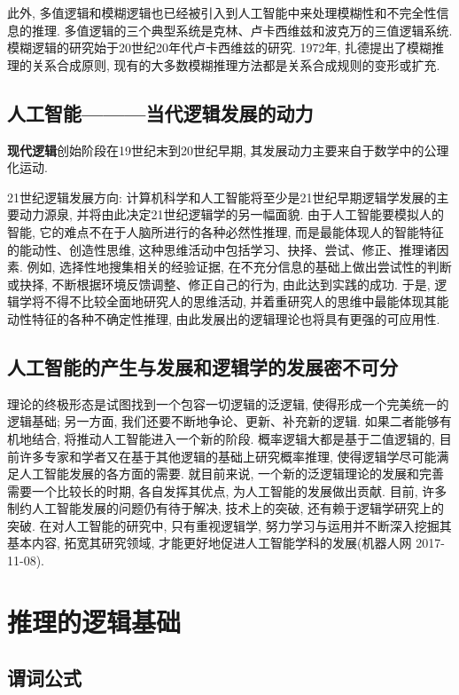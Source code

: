 此外, 多值逻辑和模糊逻辑也已经被引入到人工智能中来处理模糊性和不完全性信息的推理. 多值逻辑的三个典型系统是克林、卢卡西维兹和波克万的三值逻辑系统. 模糊逻辑的研究始于20世纪20年代卢卡西维兹的研究. 1972年, 扎德提出了模糊推理的关系合成原则, 现有的大多数模糊推理方法都是关系合成规则的变形或扩充.
\subsection{人工智能———当代逻辑发展的动力}

\textbf{现代逻辑}创始阶段在19世纪末到20世纪早期, 其发展动力主要来自于数学中的公理化运动.

21世纪逻辑发展方向: 计算机科学和人工智能将至少是21世纪早期逻辑学发展的主要动力源泉, 并将由此决定21世纪逻辑学的另一幅面貌. 由于人工智能要模拟人的智能, 它的难点不在于人脑所进行的各种必然性推理, 而是最能体现人的智能特征的能动性、创造性思维, 这种思维活动中包括学习、抉择、尝试、修正、推理诸因素. 例如, 选择性地搜集相关的经验证据, 在不充分信息的基础上做出尝试性的判断或抉择, 不断根据环境反馈调整、修正自己的行为, 由此达到实践的成功. 于是, 逻辑学将不得不比较全面地研究人的思维活动, 并着重研究人的思维中最能体现其能动性特征的各种不确定性推理, 由此发展出的逻辑理论也将具有更强的可应用性.
\subsection{人工智能的产生与发展和逻辑学的发展密不可分}

理论的终极形态是试图找到一个包容一切逻辑的泛逻辑, 使得形成一个完美统一的逻辑基础;
另一方面, 我们还要不断地争论、更新、补充新的逻辑. 如果二者能够有机地结合, 将推动人工智能进入一个新的阶段.
概率逻辑大都是基于二值逻辑的, 目前许多专家和学者又在基于其他逻辑的基础上研究概率推理, 使得逻辑学尽可能满足人工智能发展的各方面的需要.
就目前来说, 一个新的泛逻辑理论的发展和完善需要一个比较长的时期, 各自发挥其优点, 为人工智能的发展做出贡献.
目前, 许多制约人工智能发展的问题仍有待于解决, 技术上的突破, 还有赖于逻辑学研究上的突破. 在对人工智能的研究中, 只有重视逻辑学, 努力学习与运用并不断深入挖掘其基本内容, 拓宽其研究领域, 才能更好地促进人工智能学科的发展(机器人网 2017-11-08).
\section{推理的逻辑基础}
\label{AI32C3Sec3.2}
\subsection{谓词公式}
